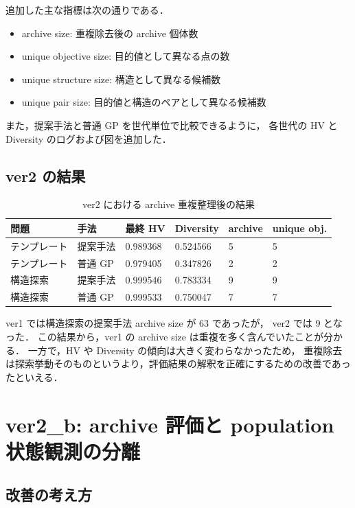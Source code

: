 \documentclass[a4paper,11pt]{ltjsarticle}
\begin{document}
追加した主な指標は次の通りである．
\begin{itemize}[leftmargin=3em]
  \item archive size: 重複除去後の archive 個体数
  \item unique objective size: 目的値として異なる点の数
  \item unique structure size: 構造として異なる候補数
  \item unique pair size: 目的値と構造のペアとして異なる候補数
\end{itemize}

また，提案手法と普通 GP を世代単位で比較できるように，
各世代の HV と Diversity のログおよび図を追加した．

\subsection{ver2 の結果}

\begin{table}[htbp]
\centering
\caption{ver2 における archive 重複整理後の結果}
\begin{tabular}{llllll}
\toprule
問題 & 手法 & 最終 HV & Diversity & archive & unique obj. \\
\midrule
テンプレート & 提案手法 & 0.989368 & 0.524566 & 5 & 5 \\
テンプレート & 普通 GP & 0.979405 & 0.347826 & 2 & 2 \\
構造探索 & 提案手法 & 0.999546 & 0.783334 & 9 & 9 \\
構造探索 & 普通 GP & 0.999533 & 0.750047 & 7 & 7 \\
\bottomrule
\end{tabular}
\end{table}

ver1 では構造探索の提案手法 archive size が 63 であったが，
ver2 では 9 となった．
この結果から，ver1 の archive size は重複を多く含んでいたことが分かる．
一方で，HV や Diversity の傾向は大きく変わらなかったため，
重複除去は探索挙動そのものというより，評価結果の解釈を正確にするための改善であったといえる．

\section{ver2\_b: archive 評価と population 状態観測の分離}

\subsection{改善の考え方}
\end{document}
